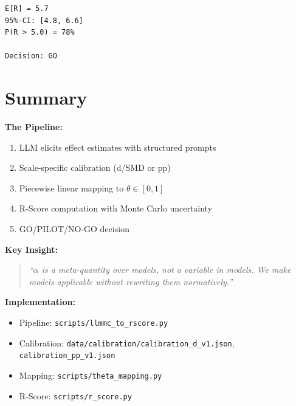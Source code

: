 \begin{verbatim}
E[R] = 5.7
95%-CI: [4.8, 6.6]
P(R > 5.0) = 78%

Decision: GO
\end{verbatim}


\section{Summary}
\label{sec:iii-summary}

\begin{tcolorbox}[colback=gray!5!white, colframe=gray!75!black,
    title=Summary: LLMMC Pipeline]

\textbf{The Pipeline:}
\begin{enumerate}[nosep]
\item LLM elicits effect estimates with structured prompts
\item Scale-specific calibration (d/SMD or pp)
\item Piecewise linear mapping to $\theta \in [0,1]$
\item R-Score computation with Monte Carlo uncertainty
\item GO/PILOT/NO-GO decision
\end{enumerate}

\textbf{Key Insight:}
\begin{quote}
\emph{``$\alpha$ is a meta-quantity over models, not a variable in models.
We make models applicable without rewriting them normatively.''}
\end{quote}

\textbf{Implementation:}
\begin{itemize}[nosep]
\item Pipeline: \texttt{scripts/llmmc\_to\_rscore.py}
\item Calibration: \texttt{data/calibration/calibration\_d\_v1.json}, \texttt{calibration\_pp\_v1.json}
\item Mapping: \texttt{scripts/theta\_mapping.py}
\item R-Score: \texttt{scripts/r\_score.py}
\end{itemize}

\end{tcolorbox}


